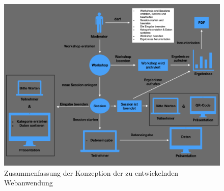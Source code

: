 \begin{figure}[H]
  \begin{center}
    \includegraphics[scale=0.45]{img/Anforderung_neu}
	\caption{Zusammenfassung der Konzeption der zu entwickelnden Webanwendung}  
	\label{fig:zusammenfassung der konzeption}
  \end{center}   
\end{figure}


